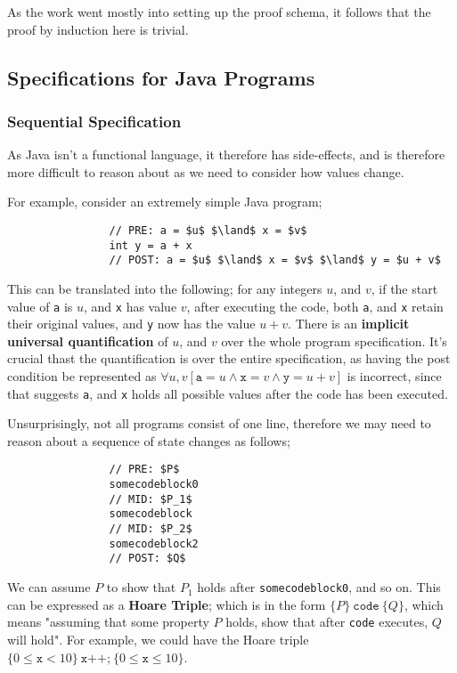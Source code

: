 \documentclass[a4paper, 12pt]{article}
\begin{document}
            As the work went mostly into setting up the proof schema, it follows that the proof by induction here is trivial.
    \subsection*{Specifications for Java Programs}
        \subsubsection*{Sequential Specification}
            As Java isn't a functional language, it therefore has side-effects, and is therefore more difficult to reason about as we need to consider how values change.
            \medskip

            For example, consider an extremely simple Java program;
            \begin{lstlisting}
                // PRE: a = $u$ $\land$ x = $v$
                int y = a + x
                // POST: a = $u$ $\land$ x = $v$ $\land$ y = $u + v$
            \end{lstlisting}
            This can be translated into the following; for any integers $u$, and $v$, if the start value of \texttt{a} is $u$, and \texttt{x} has value $v$, after executing the code, both \texttt{a}, and \texttt{x} retain their original values, and \texttt{y} now has the value $u + v$. There is an \textbf{implicit universal quantification} of $u$, and $v$ over the whole program specification. It's crucial thast the quantification is over the entire specification, as having the post condition be represented as $\forall u, v [\texttt{a} = u \land \texttt{x} = v \land \texttt{y} = u + v]$ is incorrect, since that suggests \texttt{a}, and \texttt{x} holds all possible values after the code has been executed.
            \medskip

            Unsurprisingly, not all programs consist of one line, therefore we may need to reason about a sequence of state changes as follows;
            \begin{lstlisting}
                // PRE: $P$
                somecodeblock0
                // MID: $P_1$
                somecodeblock
                // MID: $P_2$
                somecodeblock2
                // POST: $Q$
            \end{lstlisting}
            We can assume $P$ to show that $P_1$ holds after \texttt{somecodeblock0}, and so on. This can be expressed as a \textbf{Hoare Triple}; which is in the form $\{ P \}\ \texttt{code}\ \{ Q \}$, which means "assuming that some property $P$ holds, show that after \texttt{code} executes, $Q$ will hold". For example, we could have the Hoare triple $\{ 0 \leq \texttt{x} < 10 \}\ \texttt{x++;}\ \{0 \leq \texttt{x} \leq 10\}$.
            \smallskip
\end{document}
